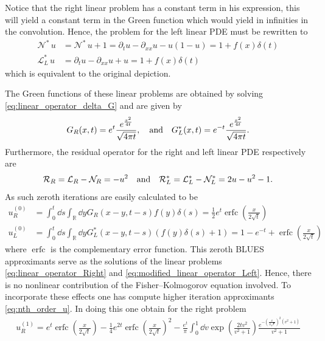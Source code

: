 \documentclass[amsmath,amssymb,amsfonts,aps,pre,preprint,superscriptaddress,bibnotes,showpacs,showkeys,longbibliography]{revtex4-1}
\newcommand{\pa}{\partial}
\DeclareMathOperator{\erfc}{erfc}
\begin{document}
Notice that the right linear problem has a constant term in his expression, this will yield a constant term in the Green function which would yield in infinities in the convolution. Hence, the problem for the left linear PDE must be rewritten to
\begin{align}\label{eq:modified_nonlinear_operator_Left}
    \mathcal{N}^*\, u &=\mathcal{N}^*\, u+1= \pa_t u -\pa_{xx}u - u(1-u)=1+f(x)\delta(t)\\
    \mathcal{L}^*_L \, u &=\pa_t u -\pa_{xx}u +u=1+f(x)\delta(t)
    \label{eq:modified_linear_operator_Left}
\end{align}
which is equivalent to the original depiction.

The Green functions of these linear problems are obtained by solving \eqref{eq:linear_operator_delta_G} and are given by
\begin{align}
    G_R(x,t) = e^{t}\frac{e^{\frac{x^2}{4 t}}}{\sqrt{4 \pi t}}, \qq{and}
    G^*_L(x,t) = e^{-t}\frac{e^{\frac{x^2}{4 t}}}{\sqrt{4 \pi t}}.
\end{align}
 Furthermore, the residual operator for the right and left linear PDE respectively are
\begin{equation}\label{eq:Risidual_operator_right_and_left}
    \mathcal{R}_R = \mathcal{L}_R-\mathcal{N}_R=-u^2 \qq{and} \mathcal{R}^*_L = \mathcal{L}^*_L-\mathcal{N}^*_L=  2u-u^2-1.
\end{equation}
As such zeroth iterations are easily calculated to be 
\begin{align}\label{eq:BLUES_zero_iteration_Right}
       u^{(0)}_R &= \int_{0}^{t} \dd{s}\int_{\mathbb{R}} \dd{y} G_R(x-y,t-s) f(y)\delta(s) 
       = \frac{1}{2} e^t \erfc\left(\frac{x}{2 \sqrt{t}}\right)\\
       u^{(0)}_L &= \int_{0}^{t} \dd{s}\int_{\mathbb{R}} \dd{y} G^*_L(x-y,t-s) (f(y)\delta(s)+1) 
       =  1- e^{-t} +\erfc\left(\frac{x}{2 \sqrt{t}}\right) 
       \label{eq:BLUES_zero_iteration_Left}
    \end{align}
where $\erfc$ is the complementary error function. This zeroth BLUES approximants serve as the solutions of the linear problems \eqref{eq:linear_operator_Right} and \eqref{eq:modified_linear_operator_Left}. Hence, there is no nonlinear contribution of the Fisher–Kolmogorov equation involved. To incorporate these effects one has compute higher iteration approximants \eqref{eq:nth_order_u}. In doing this one obtain for the right problem
\begin{multline}\label{eq:BLUES_First_iteration_Right}
    u^{(1)}_R =e^t \erfc\left(\frac{x}{2 \sqrt{t}}\right)-\frac{1}{4} e^{2 t} \erfc\left(\frac{x}{2 \sqrt{t}}\right)^2
    - \frac{e^t}{\pi}\int_0^1 \dd{v}\exp \left(\frac{2 t v^2}{v^2+1}\right)
    \frac{ e^{-\left(\frac{x}{2 \sqrt{t}}\right)^2\left(v^2+1\right) }}{v^2+1}
\end{multline}
\end{document}

